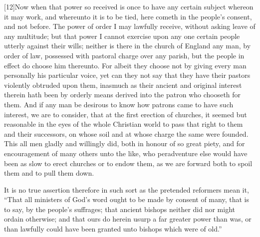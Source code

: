 [12]Now when that power so received is once to have any certain subject whereon it may work, and whereunto it is to be tied, here cometh in the people’s consent, and not before. The power of order I may lawfully receive, without asking leave of any multitude; but that power I cannot exercise upon any one certain people utterly against their wills; neither is there in the church of England any man, by order of law, possessed with pastoral charge over any parish, but the people in effect do choose him thereunto. For albeit they choose not by giving every man personally his particular voice, yet can they not say that they have their pastors violently obtruded upon them, inasmuch as their ancient and original interest therein hath been by orderly means derived into the patron who chooseth for them. And if any man be desirous to know how patrons came to have such interest, we are to consider, that at the first erection of churches, it seemed but reasonable in the eyes of the whole Christian world to pass that right to them and their successors, on whose soil and at whose charge the same were founded. This all men gladly and willingly did, both in honour of so great piety, and for encouragement of many others unto the like, who peradventure else would have been as slow to erect churches or to endow them, as we are forward both to spoil them and to pull them down.

It is no true assertion therefore in such sort as the pretended reformers mean it, “That all ministers of God’s word  ought to be made by consent of many, that is to say, by the people’s suffrages; that ancient bishops neither did nor might ordain otherwise; and that ours do herein usurp a far greater power than was, or than lawfully could have been granted unto bishops which were of old.”

